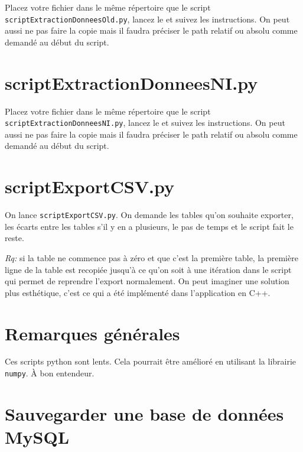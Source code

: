\documentclass{MyReportClass}
\begin{document}
Placez votre fichier dans le même répertoire que le script \verb?scriptExtractionDonneesOld.py?, lancez le et suivez les instructions. On peut aussi ne pas faire la copie mais il faudra préciser le path relatif  ou absolu comme demandé au début du script.

\section{scriptExtractionDonneesNI.py}
Placez votre fichier dans le même répertoire que le script \verb?scriptExtractionDonneesNI.py?, lancez le et suivez les instructions. On peut aussi ne pas faire la copie mais il faudra préciser le path relatif  ou absolu comme demandé au début du script.

\section{scriptExportCSV.py}
On lance \verb?scriptExportCSV.py?. On demande les tables qu'on souhaite exporter, les écarts entre les tables s'il y en a plusieurs, le pas de temps et le script fait le reste.

\emph{Rq:} si la table ne commence pas à zéro et que c'est la première table, la première ligne de la table est recopiée jusqu'à ce qu'on soit à une itération dans le script qui permet de reprendre l'export normalement. On peut imaginer une solution plus esthétique, c'est ce qui a été implémenté dans l'application en C++.

\section{Remarques générales}
Ces scripts python sont lents. Cela pourrait être amélioré en utilisant la librairie \verb?numpy?. À bon entendeur.


\begin{thebibliography}{5}
{}

\end{thebibliography}

\clearpage

\appendix

\section{Sauvegarder une base de données MySQL}
\end{document}
